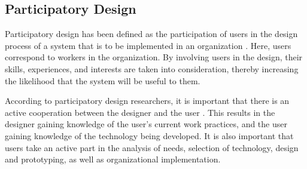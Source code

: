 



\subsection{Participatory Design}
Participatory design has been defined as the participation of users in the design process of a system that is to be implemented in an organization \cite{kensing_participatory_1998}. Here, users correspond to workers in the organization. By involving users in the design, their skills, experiences, and interests are taken into consideration, thereby increasing the likelihood that the system will be useful to them.

According to participatory design researchers, it is important that there is an active cooperation between the designer and the user \cite{kensing_participatory_1998}. This results in the designer gaining knowledge of the user's current work practices, and the user gaining knowledge of the technology being developed. It is also important that users take an active part in the analysis of needs, selection of technology, design and prototyping, as well as organizational implementation.